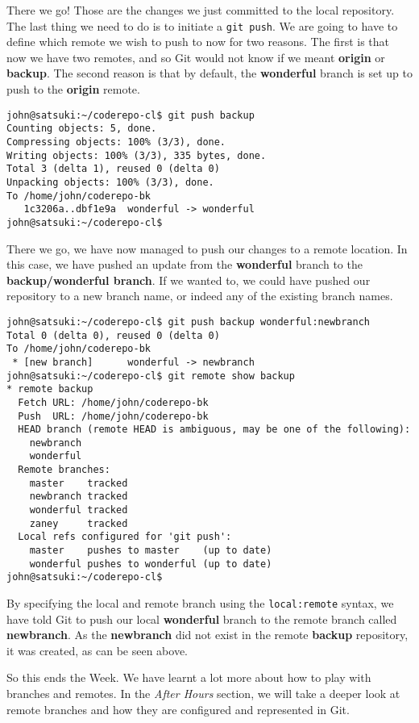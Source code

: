 There we go!  Those are the changes we just committed to the local repository.  The last thing we need to do is to initiate a \texttt{git push}.  We are going to have to define which remote we wish to push to now for two reasons.  The first is that now we have two remotes, and so Git would not know if we meant \textbf{origin} or \textbf{backup}.  The second reason is that by default, the \textbf{wonderful} branch is set up to push to the \textbf{origin} remote.

\begin{Verbatim}
john@satsuki:~/coderepo-cl$ git push backup
Counting objects: 5, done.
Compressing objects: 100% (3/3), done.
Writing objects: 100% (3/3), 335 bytes, done.
Total 3 (delta 1), reused 0 (delta 0)
Unpacking objects: 100% (3/3), done.
To /home/john/coderepo-bk
   1c3206a..dbf1e9a  wonderful -> wonderful
john@satsuki:~/coderepo-cl$ 
\end{Verbatim}

There we go, we have now managed to push our changes to a remote location.  In this case, we have pushed an update from the \textbf{wonderful} branch to the \textbf{backup/wonderful branch}.  If we wanted to, we could have pushed our repository to a new branch name, or indeed any of the existing branch names.

\begin{Verbatim}
john@satsuki:~/coderepo-cl$ git push backup wonderful:newbranch
Total 0 (delta 0), reused 0 (delta 0)
To /home/john/coderepo-bk
 * [new branch]      wonderful -> newbranch
john@satsuki:~/coderepo-cl$ git remote show backup
* remote backup
  Fetch URL: /home/john/coderepo-bk
  Push  URL: /home/john/coderepo-bk
  HEAD branch (remote HEAD is ambiguous, may be one of the following):
    newbranch
    wonderful
  Remote branches:
    master    tracked
    newbranch tracked
    wonderful tracked
    zaney     tracked
  Local refs configured for 'git push':
    master    pushes to master    (up to date)
    wonderful pushes to wonderful (up to date)
john@satsuki:~/coderepo-cl$ 
\end{Verbatim}

By specifying the local and remote branch using the \texttt{local:remote} syntax, we have told Git to push our local \textbf{wonderful} branch to the remote branch called \textbf{newbranch}.  As the \textbf{newbranch} did not exist in the remote \textbf{backup} repository, it was created, as can be seen above.

So this ends the Week.  We have learnt a lot more about how to play with branches and remotes.  In the \emph{After Hours} section, we will take a deeper look at remote branches and how they are configured and represented in Git.

